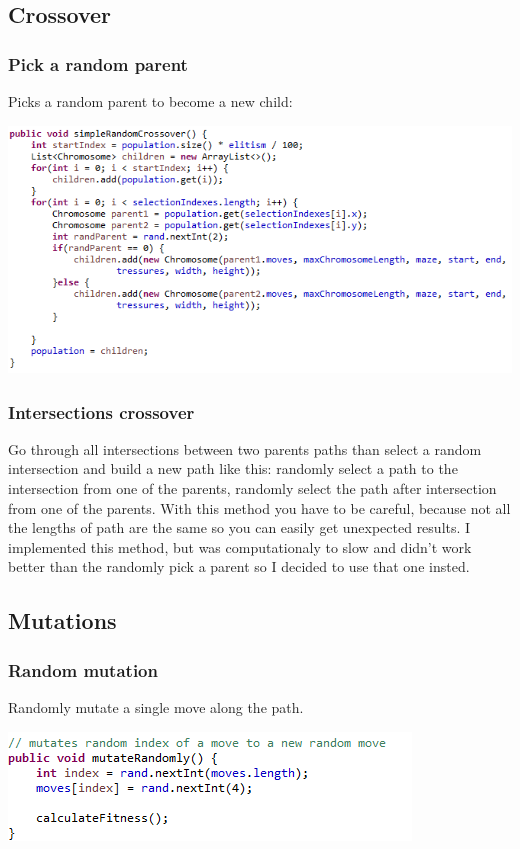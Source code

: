\documentclass[12pt]{article} %
\begin{document}
\subsection{Crossover}
\subsubsection{Pick a random parent}
Picks a random parent to become a new child:

\includegraphics[scale=1]{pickARandomParentCrossover}


\subsubsection{Intersections crossover}
Go through all intersections between two parents paths than select a random intersection and build a new path like this: randomly select a path to the
intersection from one of the parents, randomly select the path after intersection from one of the parents. With this method you have to be careful, 
because not all the lengths of path are the same so you can easily get unexpected results. I implemented this method, but was computationaly to slow 
and didn't work better than the randomly pick a parent so I decided to use that one insted.

\subsection{Mutations}
\subsubsection{Random mutation}
Randomly mutate a single move along the path.

\includegraphics[scale=1]{randomMutation}
\end{document}
